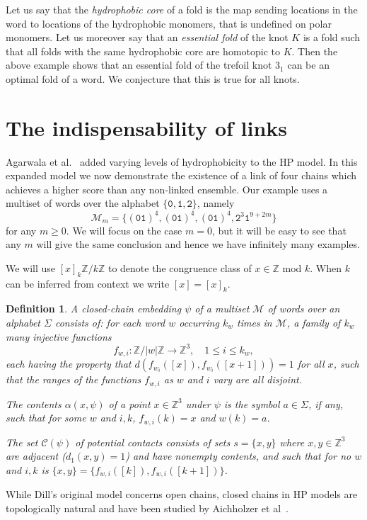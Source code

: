 \documentclass{article}
\newtheorem{definition}[theorem]{Definition}
\newcommand{\mt}{\mathtt}
\begin{document}
Let us say that the \emph{hydrophobic core} of a fold is the map sending locations in the word to locations of the hydrophobic monomers, that
is undefined on polar monomers.
Let us moreover say that an \emph{essential fold} of the knot $K$ is a fold such that all folds with the same hydrophobic core are homotopic to $K$.
Then the above example shows that an essential fold of the trefoil knot $3_1$ can be an optimal fold of a word.
We conjecture that this is true for all knots.

\section{The indispensability of links}\label{sec:indispensable}
Agarwala et al.~\cite[Section 4]{ABDDFHMS97} added varying levels of hydrophobicity to the HP model.
In this expanded model we now demonstrate the existence of a link of four chains which achieves a higher
score than any non-linked ensemble.
Our example uses a multiset of words over the alphabet $\{\mt 0,\mt 1, \mt 2\}$, namely
\[
	\mathscr M_m = \{(\mt{01})^4, (\mt{01})^4, (\mt{01})^4, \mt{2}^3\mt{1}^{9+2m}\}
\]
for any $m\ge 0$.
We will focus on the case $m=0$, but it will be easy to see that any $m$ will give the same conclusion and hence we have infinitely many examples.


We will use $[x]_k\mathbb Z/k\mathbb Z$ to denote the congruence class of $x\in\mathbb Z$ mod $k$.
When $k$ can be inferred from context we write $[x]=[x]_k$.

\begin{definition}\label{def:emb}
A \emph{closed-chain embedding} $\psi$ of a multiset $\mathscr M$ of words over an alphabet $\Sigma$ consists of:
for each word $w$ occurring $k_w$ times in $\mathscr M$, a family of $k_w$ many injective functions
\[
	f_{w,i} : \mathbb Z/|w|\mathbb Z \to \mathbb Z^3, \quad 1 \le i \le k_w,
\]
each having the property that $d(f_{w_i}([x]),f_{w_i}([x+1]))=1$ for all $x$,
such that the ranges of the functions $f_{w,i}$ as $w$ and $i$ vary are all disjoint.

The \emph{contents} $\alpha(x, \psi)$ of a point $x\in\mathbb Z^3$ under $\psi$ is the symbol $a\in\Sigma$,
if any, such that for some $w$ and $i,k$, $f_{w,i}(k)=x$ and $w(k)=a$.

The set $\mathscr C(\psi)$ of \emph{potential contacts}
consists of sets $s=\{x,y\}$ where $x,y\in\mathbb Z^3$ are adjacent ($d_1(x,y)=1$) and have nonempty contents,
and such that for no $w$ and $i,k$ is $\{x,y\}=\{f_{w,i}([k]), f_{w,i}([k+1])\}$.
\end{definition}
While Dill's original model concerns open chains,
closed chains in HP models are topologically natural and have been studied by Aichholzer et al~\cite{AICHHOLZER2003139}.
\end{document}
